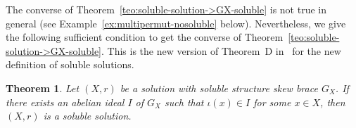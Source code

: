 \documentclass[12pt, a4paper, english]{article}
\newtheorem{teorema}{Theorem}[section]
\theoremstyle{definition}
\theoremstyle{remark}
\DeclareMathOperator{\Ker}{Ker}
\DeclareMathOperator{\Soc}{Soc}
\newcommand{\bigcdot}{\boldsymbol{\cdot}}
\newcounter{cond}
\begin{document}
%
%

The converse of Theorem~\ref{teo:soluble-solution->GX-soluble} is not true in general (see Example~\ref{ex:multipermut-nosoluble} below). Nevertheless, we give the following sufficient condition to get the converse of Theorem~\ref{teo:soluble-solution->GX-soluble}. This is the new version of Theorem~D in~\cite{BallesterEstebanJimenezPerezC24-solubleskewbraces} for the new definition of soluble solutions.

\begin{teorema}
\label{teo:G_X-soluble+xinI->Xsoluble}
Let $(X,r)$ be a solution with soluble structure skew brace $G_X$. If there exists an abelian ideal $I$ of $G_X$ such that $\iota(x) \in I$ for some $x\in X$, then $(X,r)$ is a soluble solution.
\end{teorema}
\end{document}
